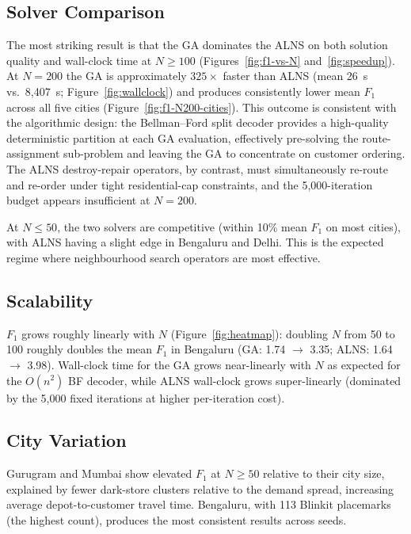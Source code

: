 \subsection{Solver Comparison}

The most striking result is that the GA dominates the ALNS on both
solution quality and wall-clock time at $N \geq 100$
(Figures~\ref{fig:f1-vs-N} and~\ref{fig:speedup}). At $N = 200$
the GA is approximately $325\times$ faster than ALNS (mean 26~s
vs.\ 8{,}407~s; Figure~\ref{fig:wallclock}) and produces consistently
lower mean $F_1$ across all five cities
(Figure~\ref{fig:f1-N200-cities}). This outcome is consistent with the algorithmic
design: the Bellman--Ford split decoder provides a high-quality
deterministic partition at each GA evaluation, effectively
pre-solving the route-assignment sub-problem and leaving the GA to
concentrate on customer ordering. The ALNS destroy-repair operators,
by contrast, must simultaneously re-route and re-order under tight
residential-cap constraints, and the 5{,}000-iteration budget
appears insufficient at $N = 200$.

At $N \leq 50$, the two solvers are competitive (within 10\% mean
$F_1$ on most cities), with ALNS having a slight edge in Bengaluru
and Delhi. This is the expected regime where neighbourhood search
operators are most effective.

\subsection{Scalability}

$F_1$ grows roughly linearly with $N$ (Figure~\ref{fig:heatmap}):
doubling $N$ from 50 to 100 roughly doubles the mean $F_1$ in Bengaluru (GA: 1.74 $\rightarrow$
3.35; ALNS: 1.64 $\rightarrow$ 3.98). Wall-clock time for the GA
grows near-linearly with $N$ as expected for the $O(n^2)$ BF decoder,
while ALNS wall-clock grows super-linearly (dominated by the 5{,}000
fixed iterations at higher per-iteration cost).

\subsection{City Variation}

Gurugram and Mumbai show elevated $F_1$ at $N \geq 50$ relative to
their city size, explained by fewer dark-store clusters relative to
the demand spread, increasing average depot-to-customer travel time.
Bengaluru, with 113 Blinkit placemarks (the highest count), produces
the most consistent results across seeds.

